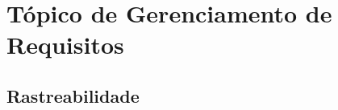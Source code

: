 \chapter[Tópico de Gerenciamento de Requisitos]{Tópico de Gerenciamento de Requisitos}

\section{Rastreabilidade}